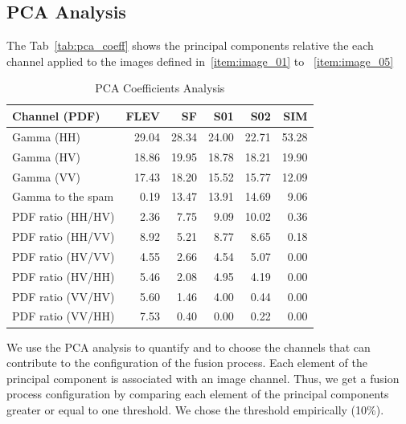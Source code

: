 \documentclass[remotesensing,article,submit,pdftex,moreauthors]{Definitions/mdpi}
\begin{document}
\subsection{PCA Analysis}
The Tab~\eqref{tab:pca_coeff} shows the principal components relative the each channel applied to the images defined in~\ref{item:image_01} to ~\ref{item:image_05} 
\begin{table}[hbt!]
	\centering
	\caption{PCA Coefficients Analysis}\label{tab:pca_coeff}
	\begin{tabular}{@{}lrrrrr@{}} \toprule
		    Channel (PDF)     & FLEV  & SF    & S01   & S02      & SIM \\ \midrule
		    Gamma (HH)        & 29.04 & 28.34 & 24.00 & 22.71 & 53.28\\
		    Gamma (HV)        & 18.86 & 19.95 & 18.78 & 18.21 & 19.90\\ 
            Gamma (VV)        & 17.43 & 18.20 & 15.52 & 15.77 & 12.09\\
            Gamma to the spam &  0.19 & 13.47 & 13.91 & 14.69 &  9.06 \\
            PDF ratio (HH/HV) &  2.36 &  7.75 &  9.09 & 10.02 &  0.36\\
            PDF ratio (HH/VV) &  8.92 &  5.21 &  8.77 &  8.65 &  0.18\\
            PDF ratio (HV/VV) &  4.55 &  2.66 &  4.54 &  5.07 &  0.00\\
            PDF ratio (HV/HH) &  5.46 &  2.08 &  4.95 &  4.19 &  0.00\\
            PDF ratio (VV/HV) &  5.60 &  1.46 &  4.00 &  0.44 &  0.00\\
            PDF ratio (VV/HH) &  7.53 &  0.40 &  0.00 &  0.22 &  0.00\\
  \bottomrule
	\end{tabular}
\end{table}

We use the PCA analysis to  quantify and to choose the channels that can contribute to the configuration of the fusion process. Each element of the principal component is associated with an image channel. Thus, we get a fusion process configuration by comparing each element of the principal components greater or equal to one threshold. We chose the threshold empirically (10\%).
%
\end{document}
